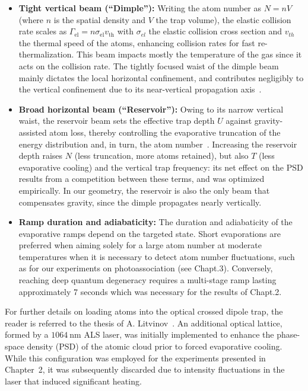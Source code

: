 \begin{itemize}
    \item \textbf{Tight vertical beam (``Dimple''):} Writing the atom number as $N = nV$ (where $n$ is the spatial density and $V$ the trap volume), the elastic collision rate scales as $\Gamma_{\text{el}} = n\sigma_{\text{el}}v_{\text{th}}$ with $\sigma_{el}$ the elastic collision cross section and $v_{th}$ the thermal speed of the atoms, enhancing collision rates for fast re-thermalization. This
    beam impacts mostly the temperature of the gas since it acts on the collision rate. The tightly focused waist of the dimple beam mainly dictates the local horizontal confinement, and contributes negligibly to the vertical confinement due to its near-vertical propagation axis~\cite{stellmer_production_2012}.

    \item \textbf{Broad horizontal beam (``Reservoir''):} Owing to its narrow vertical waist, the reservoir beam sets the effective trap depth $U$ against gravity-assisted atom loss, thereby controlling the evaporative truncation of the energy distribution and, in turn, the atom number~\cite{stellmer_production_2012}. Increasing the reservoir depth raises $N$ (less truncation, more atoms retained), but also $T$ (less evaporative cooling) and the vertical trap frequency: its net effect on the PSD results from a competition between these terms, and was optimized empirically. In our geometry, the reservoir is also the only beam that compensates gravity, since the dimple propagates nearly vertically. 

    \item \textbf{Ramp duration and adiabaticity:} The duration and adiabaticity of the evaporative ramps depend on the targeted state. Short evaporations are preferred when aiming solely for a large atom number at moderate temperatures when it is necessary to detect atom number fluctuations, such as for our experiments on photoassociation (see Chapt.3).
    Conversely, reaching deep quantum degeneracy requires a multi-stage ramp lasting approximately 7 seconds which was necessary for the results of Chapt.2.
\end{itemize}
For further details on loading atoms into the optical crossed dipole trap, the reader is referred to the thesis of A. Litvinov~\cite{litvinov_these}. An additional optical lattice, formed by a $1064~\text{nm}$ ALS laser, was initially implemented to enhance the phase-space density (PSD) of the atomic cloud prior to forced evaporative cooling. While this configuration was employed for the experiments presented in Chapter~2, it was subsequently discarded due to intensity fluctuations in the laser that induced significant heating.

